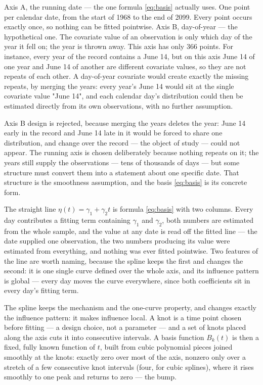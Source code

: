 \documentclass[11pt]{article}
\begin{document}
{\color{blue} 
Axis A, the running date — the one formula  \eqref{eq:basis} actually uses. One point per calendar date, from the start of 1968 to the end of 2099. Every point occurs exactly once, so nothing can be fitted pointwise.
Axis B, day-of-year — the hypothetical one. The covariate value of an observation is only which day of the year it fell on; the year is thrown away. This axis has only 366 points.  For instance, every year of the record contains a June 14, but on this axis June 14 of one year and June 14 of another are different covariate values, so they are not repeats of each other. A day-of-year covariate would create exactly the missing repeats, by merging the years: every year's June 14 would sit at the single covariate value "June 14", and each calendar day's distribution could then be estimated directly from its own observations, with no further assumption. 

Axis B design is rejected, because merging the years deletes the year: June 14 early in the record and June 14 late in it would be forced to share one distribution, and change over the record — the object of study — could not appear. The running axis is chosen deliberately because nothing repeats on it; the years still supply the observations — tens of thousands of days — but some structure must convert them into a statement about one specific date. That structure is the smoothness assumption, and the basis  \eqref{eq:basis} is its concrete form.


The straight line $\eta(t) = \gamma_1 + \gamma_2 t$ is formula \eqref{eq:basis} with two columns. Every day contributes a fitting term containing $\gamma_1$ and $\gamma_2$, both numbers are estimated from the whole sample, and the value at any date is read off the fitted line — the date supplied one observation, the two numbers producing its value were estimated from everything, and nothing was ever fitted pointwise. Two features of the line are worth naming, because the spline keeps the first and changes the second: it is one single curve defined over the whole axis, and its influence pattern is global — every day moves the curve everywhere, since both coefficients sit in every day's fitting term. 

The spline keeps the mechanism and the one-curve property, and changes exactly the influence pattern: it makes influence local. A knot is a time point chosen before fitting — a design choice, not a parameter — and a set of knots placed along the axis cuts it into consecutive intervals. A basis function $B_k(t)$ is then a fixed, fully known function of $t$, built from cubic polynomial pieces joined smoothly at the knots: exactly zero over most of the axis, nonzero only over a stretch of a few consecutive knot intervals (four, for cubic splines), where it rises smoothly to one peak and returns to zero — the bump.

}
\end{document}
